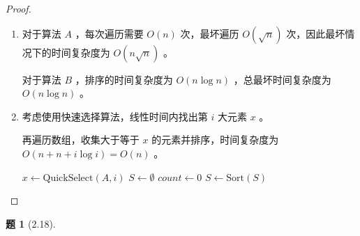 \documentclass[11pt, a4paper]{article}
\newtheorem{problem}{题}
\begin{document}
\begin{proof}
    \leavevmode
    \begin{enumerate}[label=(\arabic*)]
        \item 对于算法 $A$ ，每次遍历需要 $O(n)$ 次，最坏遍历 $O(\sqrt{n})$ 次，因此最坏情况下的时间复杂度为 $O(n \sqrt{n})$ 。

        对于算法 $B$ ，排序的时间复杂度为 $O(n \log n)$ ，总最坏时间复杂度为 $O(n \log n)$ 。
        \item 考虑使用快速选择算法，线性时间内找出第 $i$ 大元素 $x$ 。

        再遍历数组，收集大于等于 $x$ 的元素并排序，时间复杂度为 $O(n+n+i \log i) = O(n)$ 。
        
        \begin{algorithm}[H]
        \caption{找出数组中最大的 $i$ 个元素并排序}
        
        $x \leftarrow \text{QuickSelect}(A, i)$\;
        $S \leftarrow \emptyset$\;
        $count \leftarrow 0$\;
        $S \leftarrow \text{Sort}(S)$\;
        \;
        \end{algorithm}
    \end{enumerate}
\end{proof}

\begin{problem}[2.18]
\end{problem}
\end{document}
